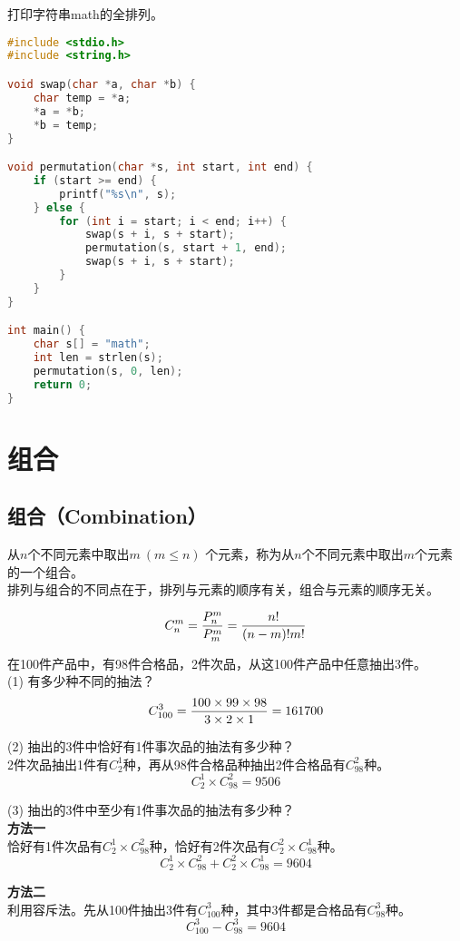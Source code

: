 \begin{tcolorbox}
	打印字符串math的全排列。
\end{tcolorbox}

\begin{lstlisting}[language=C, title=全排列]
#include <stdio.h>
#include <string.h>

void swap(char *a, char *b) {
	char temp = *a;
	*a = *b;
	*b = temp;
}

void permutation(char *s, int start, int end) {
	if (start >= end) {
		printf("%s\n", s);
	} else {
		for (int i = start; i < end; i++) {
			swap(s + i, s + start);
			permutation(s, start + 1, end);
			swap(s + i, s + start);
		}
	}
}

int main() {
	char s[] = "math";
	int len = strlen(s);
	permutation(s, 0, len);
	return 0;
}
\end{lstlisting}

\newpage

\section{组合}

\subsection{组合（Combination）}

从$ n $个不同元素中取出$ m\ (m \le n) $ 个元素，称为从$ n $个不同元素中取出$ m $个元素的一个组合。\\

排列与组合的不同点在于，排列与元素的顺序有关，组合与元素的顺序无关。

\vspace{-1cm}

\begin{align}
	C_n^m = {P_n^m \over P_m^m} = {n! \over (n-m)!m!}
\end{align}

\begin{tcolorbox}
	在100件产品中，有98件合格品，2件次品，从这100件产品中任意抽出3件。\\
	(1) 有多少种不同的抽法？
	$$
		C_{100}^3 = {100 \times 99 \times 98 \over 3 \times 2 \times 1} = 161700
	$$

	(2) 抽出的3件中恰好有1件事次品的抽法有多少种？\\
	2件次品抽出1件有$ C_2^1 $种，再从98件合格品种抽出2件合格品有$ C_{98}^2 $种。
	$$
		C_2^1 \times C_{98}^2 = 9506
	$$

	(3) 抽出的3件中至少有1件事次品的抽法有多少种？\\
	\textbf{方法一}\\
	恰好有1件次品有$ C_2^1 \times C_{98}^2 $种，恰好有2件次品有$ C_2^2 \times C_{98}^1 $种。
	$$
		C_2^1 \times C_{98}^2 + C_2^2 \times C_{98}^1 = 9604
	$$

	\textbf{方法二}\\
	利用容斥法。先从100件抽出3件有$ C_{100}^3 $种，其中3件都是合格品有$ C_{98}^3 $种。
	$$
		C_{100}^3 - C_{98}^3 = 9604
	$$
\end{tcolorbox}

